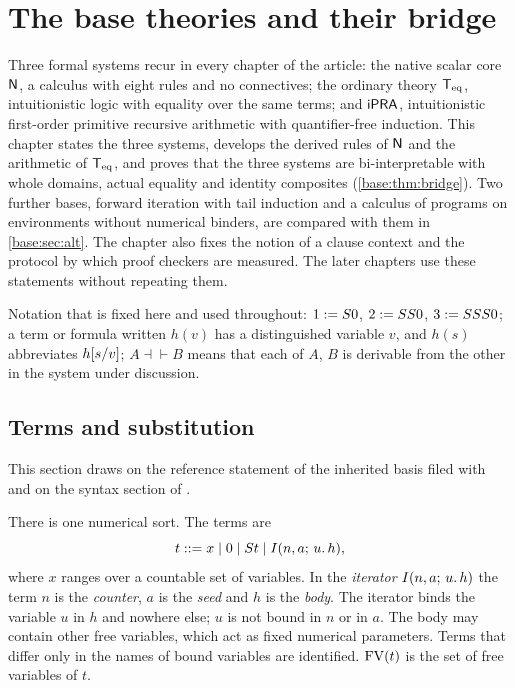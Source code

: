 \chapter{The base theories and their bridge}
\label{prov:ch:base}
\label{base:chap}

Three formal systems recur in every chapter of the article: the native
scalar core $\mathsf{N}$, a calculus with eight rules and no connectives; the
ordinary theory $\mathsf{T}_{\mathrm{eq}}$, intuitionistic logic with equality over the same
terms; and $\mathsf{iPRA}$, intuitionistic first-order primitive recursive
arithmetic with quantifier-free induction.  This chapter states the three
systems, develops the derived rules of $\mathsf{N}$ and the arithmetic of $\mathsf{T}_{\mathrm{eq}}$,
and proves that the three systems are bi-interpretable with whole domains,
actual equality and identity composites
(\cref{base:thm:bridge}).  Two further bases, forward iteration with tail
induction and a calculus of programs on environments without numerical
binders, are compared with them in \cref{base:sec:alt}.  The chapter also
fixes the notion of a clause context and the protocol by which proof
checkers are measured.  The later chapters use
these statements without repeating them.

Notation that is fixed here and used throughout: $1\mathrel{:=}S 0$,
$2\mathrel{:=}SS 0$, $3\mathrel{:=}SSS 0$; a term or formula written
$h(v)$ has a distinguished variable $v$, and $h(s)$ abbreviates
$h[s/v]$; $A\dashv\vdash B$ means that each of $A$, $B$ is derivable
from the other in the system under discussion.

\section{Terms and substitution}
\label{base:sec:terms}

This section draws on the reference statement of the inherited basis filed
with  and on the syntax section of .

\begin{definition}[Terms]
\label{base:def:terms}
There is one numerical sort.  The terms are
\[
 t ::= x \mid 0 \mid S t \mid I(n,a;\,u.\,h),
\]
where $x$ ranges over a countable set of variables.  In the \emph{iterator}
$I(n,a;\,u.\,h)$ the term $n$ is the \emph{counter}, $a$ is the \emph{seed}
and $h$ is the \emph{body}.  The iterator binds the variable $u$ in $h$ and
nowhere else; $u$ is not bound in $n$ or in $a$.  The body may contain other
free variables, which act as fixed numerical parameters.  Terms that differ
only in the names of bound variables are identified.  $\operatorname{FV}(t)$ is the set of
free variables of $t$.
\end{definition}

